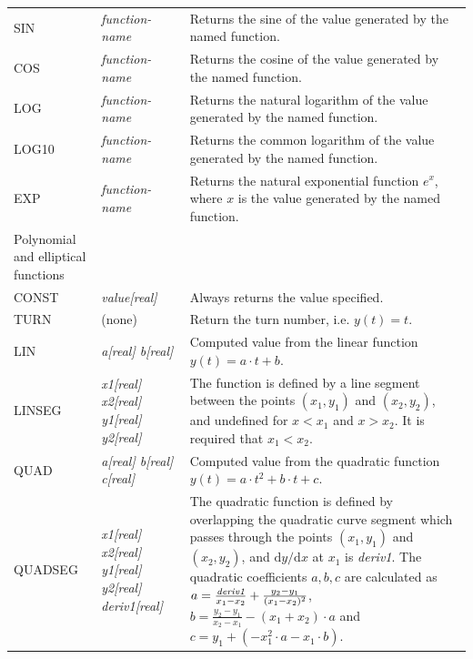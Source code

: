 \begin{center}
\begin{longtable}{|p{2.25cm} | p{4cm} p{9.5cm}|}
  SIN        & \emph{function-name} & 
  Returns the sine of the value generated by the named function. \\*
  
  COS        & \emph{function-name} &
  Returns the cosine of the value generated by the named function. \\*
  
  LOG        & \emph{function-name} &
  Returns the natural logarithm of the value generated by the named function. \\*
  
  LOG10      & \emph{function-name} &
  Returns the common logarithm of the value generated by the named function. \\*
  
  EXP        & \emph{function-name} &
  Returns the natural exponential function $e^x$, where $x$ is the value generated by the named function. \\
  
  \hline
  \rowcolor{blue!15}
  Polynomial and elliptical functions &  & \\*

  CONST       & \emph{value[real]} & 
  Always returns the value specified.\\*

  TURN        & (none) & 
  Return the turn number, i.e. $y(t) = t$.\\*

  LIN         & \emph{a[real] b[real]} & 
  Computed value from the linear function $y(t) = a\cdot t + b$. \\*

  LINSEG      & \emph{x1[real] x2[real] y1[real] y2[real]} & 
  The function is defined by a line segment between the points $(x_1,y_1)$ and $(x_2,y_2)$, and undefined for $x < x_1$ and $x>x_2$. 
  It is required that $x_1 < x_2$.\\*

  QUAD        & \emph{a[real] b[real] c[real]} & 
  Computed value from the quadratic function $y(t) = a\cdot t^2 + b\cdot t + c$. \\*

  QUADSEG     & \emph{x1[real] x2[real] y1[real] y2[real] deriv1[real]} & 
  The quadratic function is defined by overlapping the quadratic curve segment which passes through the points $(x_1,y_1)$ and $(x_2,y_2)$, and $\mathrm{d}y/\mathrm{d}x$ at $x_1$ is \emph{deriv1}. 
  The quadratic coefficients $a,b,c$ are calculated as $a = \frac{\emph{deriv1}}{x_1-x_2} + \frac{y_2-y_1}{(x_1-x_2)^2}$, $b=\frac{y_2-y_1}{x_2-x_1} - (x_1+x_2)\cdot a$ and $c = y_1 + \left(- x_1^2 \cdot a - x_1 \cdot b \right)$.\\


\end{longtable}
\end{center}
